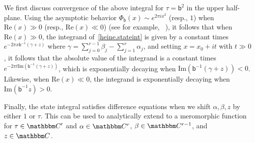 \documentclass[12pt,reqno]{amsart}
\theoremstyle{definition}
\def\CW#1{\textcolor[rgb]{1.00,0.00,0.00}{[CW:#1]}}
\def\BR{\mathbbm R}
\def\BC{\mathbbm C}
\def\calI{\mathcal I}
\def\tq{\tilde{q}}
\def\ve{\varepsilon}
\def\Re{\mathrm{Re}}
\def\Im{\mathrm{Im}}
\def\be{\begin{equation}}
\def\ee{\end{equation}}
\def\sfb{\mathsf{b}}
\def\e{\bold e}
\def\sfb{\mathsf{b}}
\begin{document}
We first discuss convergence of the above integral for
$\tau=\sfb^2$ in the upper half-plane. Using the asymptotic behavior
$\Phi_{\sfb}(x) \sim e^{2 \pi i x^2}$ (resp., $1$) when $\Re(x) \gg 0$
(resp., $\Re(x) \ll 0$) (see for example, ~\cite[Eqn.(46)]{AK}), it follows that
when $\Re(x)\gg 0$, the integrand of~\eqref{heine.stateint} is given by a constant
times $e^{-2\pi x \sfb^{-1} (\gamma+z)}$ where
$\gamma=\sum_{j=0}^{r-1}\beta_j-\sum_{j=1}^r \alpha_j$, and setting $x=x_0+i t$
with $t \gg 0$, it follows that the absolute value of the integrand is a constant
times $e^{-2\pi t \Im(\sfb^{-1}(\gamma+z))}$, which is exponentially decaying when
$\Im( \sfb^{-1}(\gamma+z))<0$. Likewise, when $\Re(x) \ll 0$, the integrand is
exponentially decaying when $\Im(\sfb^{-1} z)>0$. 

Finally, the state integral satisfies difference equations when we shift $\alpha,\beta,z$ by either $1$ or $\tau$. This can be used to analytically extend to a meromorphic function for $\tau\in\BC'$ and $\alpha\in\BC^{r}$, $\beta\in\BC^{r-1}$, and $z\in\BC$.
\end{document}
